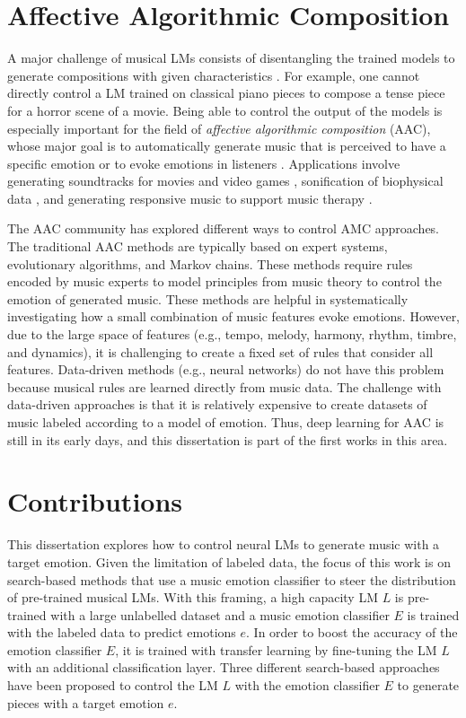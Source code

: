 \section{Affective Algorithmic Composition}

A major challenge of musical LMs consists of disentangling the trained models to generate compositions with given characteristics \cite{ferreira_2019}. For example, one cannot directly control a LM trained on classical piano pieces to compose a tense piece for a horror scene of a movie. Being able to control the output of the models is especially important for the field of \textit{affective algorithmic composition} (AAC), whose major goal is to automatically generate music that is perceived to have a specific emotion or to evoke emotions in listeners \cite{williams2015investigating}. Applications involve generating soundtracks for movies and video games \cite{williams2015dynamic}, sonification of biophysical data \cite{Chen2015}, and generating responsive music to support music therapy \cite{miranda2011brain}.

The AAC community has explored different ways to control AMC approaches. The traditional AAC methods are typically based on expert systems, evolutionary algorithms, and Markov chains. These methods require rules encoded by music experts to model principles from music theory to control the emotion of generated music. These methods are helpful in systematically investigating how a small combination of music features evoke emotions. However, due to the large space of features (e.g., tempo, melody, harmony, rhythm, timbre, and dynamics), it is challenging to create a fixed set of rules that consider all features. Data-driven methods (e.g., neural networks) do not have this problem because musical rules are learned directly from music data. The challenge with data-driven approaches is that it is relatively expensive to create datasets of music labeled according to a model of emotion. Thus, deep learning for AAC is still in its early days, and this dissertation is part of the first works in this area.

\section{Contributions}

This dissertation explores how to control neural LMs to generate music with a target emotion. Given the limitation of labeled data, the focus of this work is on search-based methods that use a music emotion classifier to steer the distribution of pre-trained musical LMs. With this framing, a high capacity LM $L$ is pre-trained with a large unlabelled dataset and a music emotion classifier $E$ is trained with the labeled data to predict emotions $e$. In order to boost the accuracy of the emotion classifier $E$, it is trained with transfer learning by fine-tuning the LM $L$ with an additional classification layer. Three different search-based approaches have been proposed to control the LM $L$ with the emotion classifier $E$ to generate pieces with a target emotion $e$.

